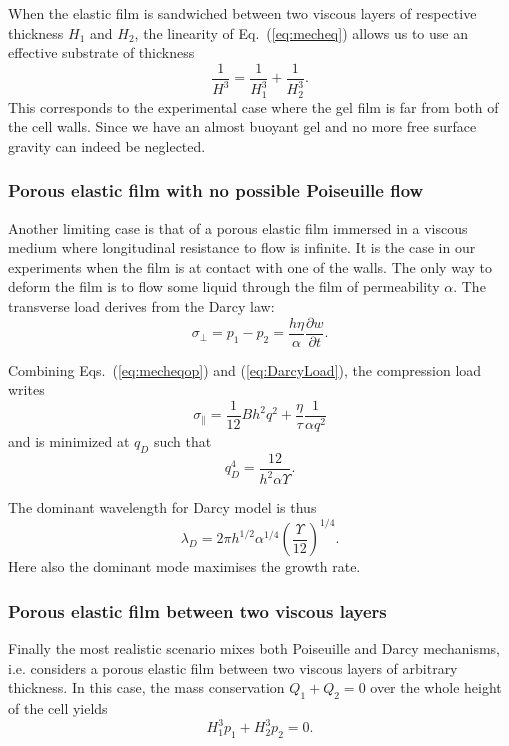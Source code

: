 \documentclass[twocolumn,superscriptaddress,showpacs,preprintnumbers,
amsmath,amssymb,prl]{revtex4-1}
\begin{document}
When the elastic film is sandwiched between two viscous layers of respective thickness $H_1$ and $H_2$, the linearity of Eq.~(\ref{eq:mecheq}) allows us to use an effective substrate of thickness 
\begin{equation}
\frac{1}{H^3} = \frac{1}{H_1^3}+\frac{1}{H_2^3}.
\end{equation}
This corresponds to the experimental case where the gel film is far from both of the cell walls. Since we have an almost buoyant gel and no more free surface gravity can indeed be neglected.

\subsubsection*{Porous elastic film with no possible Poiseuille flow}
Another limiting case is that of a porous elastic film immersed in a viscous medium where longitudinal resistance to flow is infinite. It is the case in our experiments when the film is at contact with one of the walls. The only way to deform the film is to flow some liquid through the film of permeability $\alpha$. The transverse load derives from the Darcy law:
\begin{equation}
\sigma_\perp = p_1-p_2 = \frac{h\eta}{\alpha}\frac{\partial w}{\partial t}.
\label{eq:DarcyLoad}
\end{equation}

Combining Eqs.~(\ref{eq:mecheqop}) and (\ref{eq:DarcyLoad}), the compression load writes
\begin{equation}
\sigma_\parallel = \frac{1}{12}B h^2 q^2 + \frac{\eta}{\tau}\frac{1}{\alpha q^2}
\label{eq:sigma0D}
\end{equation}
and is minimized at $q_D$ such that
\begin{equation}
q_D^4 = \frac{12}{h^2\alpha\Upsilon}.
\label{eq:qD}
\end{equation}

The dominant wavelength for Darcy model is thus
\begin{equation}
\lambda_D = 2\pi h^{1/2}\alpha^{1/4}\left(\frac{\Upsilon}{12}\right)^{1/4}.
\end{equation}
Here also the dominant mode maximises the growth rate.


\subsubsection*{Porous elastic film between two viscous layers}
Finally the most realistic scenario mixes both Poiseuille and Darcy mechanisms, i.e. considers a porous elastic film between two viscous layers of arbitrary thickness. In this case, the mass conservation $Q_1 + Q_2 = 0$ over the whole height of the cell yields
\begin{equation}
H_1^3 p_1 + H_2^3 p_2 = 0.
\label{eq:pressures}
\end{equation}
\end{document}
